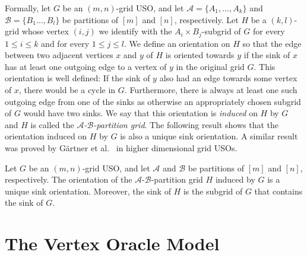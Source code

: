 \documentclass[runningheads,a4paper]{llncs}
\newcommand{\A}{\ensuremath{\mathcal A}}
\newcommand{\B}{\ensuremath{\mathcal B}}
\newcommand{\abpart}{$\A$-$\B$-partition grid\xspace}
\begin{document}
Formally, let $G$ be an $(m,n)$-grid USO,
and let $\A = \{A_1,\ldots,A_k\}$ and $\B = \{B_1\ldots, B_l\}$ be partitions of $[m]$ and $[n]$, respectively.
Let $H$ be a $(k,l)$-grid whose vertex $(i,j)$ we identify with the $A_i \times B_j$-subgrid of $G$ for every $1\leq i \leq k$ and for every $1 \leq j \leq l$. 
We define an orientation on $H$ so that the edge between two adjacent vertices $x$ and $y$ of $H$ is oriented towards $y$ if the sink of $x$ has at least one outgoing edge to a vertex of $y$ in the original grid $G$. 
This orientation is well defined: If the sink of $y$ also had an edge towards some vertex of $x$, there would be a cycle in $G$. 
Furthermore, there is always at least one such outgoing edge from one of the sinks as otherwise an appropriately chosen subgrid of $G$ would have two sinks. 
We say that this orientation is \emph{induced} on $H$ by $G$ and $H$ is called the \emph{\abpart}. 
The following result shows that the orientation induced on $H$ by $G$ is also a unique sink orientation. 
A similar result was proved by G\"artner et al.~\cite{grid08} in higher dimensional grid USOs.




\begin{lemma}\label{lemma:USO-Lemma}
Let $G$ be an $(m,n)$-grid USO,
and let $\A$ and $\B$ be partitions of $[m]$ and $[n]$, respectively.
The orientation of the $\A$-$\B$-partition grid $H$ induced by $G$ is a unique sink orientation.
Moreover, the sink of $H$ is the subgrid of $G$ that contains the sink of $G$.
\end{lemma}


\section{The Vertex Oracle Model}
\label{section:The vertex oracle model}
\end{document}
